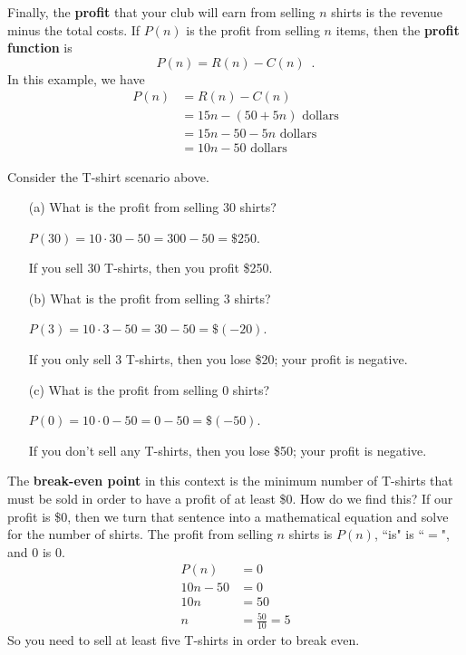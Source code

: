 Finally, the {\bf profit} that your club will earn from selling $n$ shirts is the revenue minus the total costs. If $P(n)$ is the profit from selling $n$ items, then the {\bf profit function} is
$$P(n) = R(n) - C(n) \enspace .$$
In this example, we have
\begin{align*}
P(n) &= R(n) - C(n)\\
&= 15n - (50 + 5n) \mbox{ dollars}\\
&= 15n - 50 - 5n \mbox{ dollars}\\
&= 10n - 50 \mbox{ dollars}
\end{align*}
\begin{example}
Consider the T-shirt scenario above.
    \begin{itemize}
        \item[(a)] What is the profit from selling 30 shirts?

        \solution $P(30) = 10\cdot 30 - 50 = 300 - 50 = \$250$.

        If you sell 30 T-shirts, then you profit \$250.

        \item[(b)] What is the profit from selling 3 shirts?

        \solution $P(3) = 10\cdot 3 - 50 = 30-50 = \$(-20)$.

        If you only sell 3 T-shirts, then you lose \$20; your profit is negative.
        \item[(c)] What is the profit from selling 0 shirts?

        \solution $P(0) = 10\cdot 0 - 50 = 0-50 = \$(-50)$.

        If you don't sell any T-shirts, then you lose \$50; your profit is negative.
    \end{itemize}
\end{example}
The {\bf break-even point} in this context is the minimum number of T-shirts that must be sold in order to have a profit of at least \$0. How do we find this? If our profit is \$0, then we turn that sentence into a mathematical equation and solve for the number of shirts. The profit from selling $n$ shirts is $P(n)$, ``is" is ``$=$", and $0$ is $0$.
\begin{align*}
P(n) &= 0 \\
10n-50 &= 0\\
10n &= 50 \\
n &= \frac{50}{10} = 5
\end{align*}
So you need to sell at least five T-shirts in order to break even.

